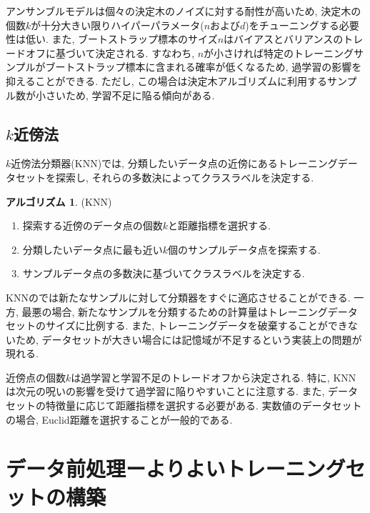 \documentclass[uplatex]{jsarticle}
\theoremstyle{definition}
\newtheorem{algorithm}[definition]{アルゴリズム}
\numberwithin{equation}{section}
\begin{document}
アンサンブルモデルは個々の決定木のノイズに対する耐性が高いため, 決定木の個数$k$が十分大きい限りハイパーパラメータ($n$および$d$)をチューニングする必要性は低い.
また, ブートストラップ標本のサイズ$n$はバイアスとバリアンスのトレードオフに基づいて決定される.
すなわち, $n$が小さければ特定のトレーニングサンプルがブートストラップ標本に含まれる確率が低くなるため, 過学習の影響を抑えることができる.
ただし, この場合は決定木アルゴリズムに利用するサンプル数が小さいため, 学習不足に陥る傾向がある.

\subsection{$k$近傍法}
$k$近傍法分類器(KNN)では, 分類したいデータ点の近傍にあるトレーニングデータセットを探索し, それらの多数決によってクラスラベルを決定する.
\begin{algorithm}
    (KNN)
    \begin{enumerate}
        \item
        探索する近傍のデータ点の個数$k$と距離指標を選択する.

        \item
        分類したいデータ点に最も近い$k$個のサンプルデータ点を探索する.

        \item
        サンプルデータ点の多数決に基づいてクラスラベルを決定する.
    \end{enumerate}
\end{algorithm}
KNNのでは新たなサンプルに対して分類器をすぐに適応させることができる.
一方, 最悪の場合, 新たなサンプルを分類するための計算量はトレーニングデータセットのサイズに比例する.
また, トレーニングデータを破棄することができないため, データセットが大きい場合には記憶域が不足するという実装上の問題が現れる.

近傍点の個数$k$は過学習と学習不足のトレードオフから決定される.
特に, KNNは次元の呪いの影響を受けて過学習に陥りやすいことに注意する.
また, データセットの特徴量に応じて距離指標を選択する必要がある.
実数値のデータセットの場合, Euclid距離を選択することが一般的である. 


\section{データ前処理ーよりよいトレーニングセットの構築}
\end{document}
